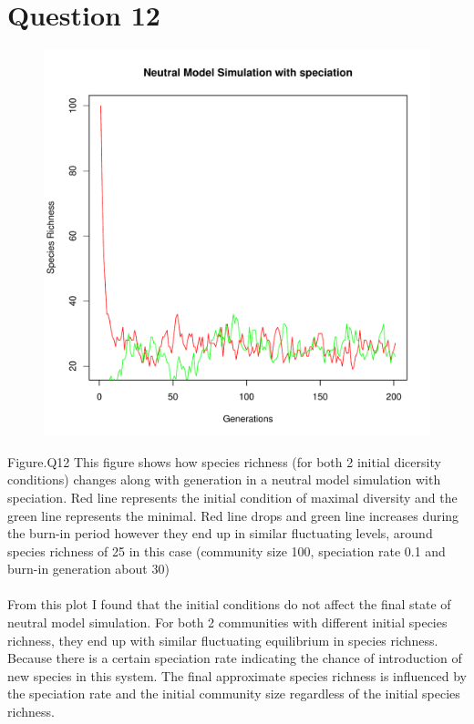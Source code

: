 \documentclass[12pt,a4paper]{article}
\begin{document}
\newpage
\section{Question 12}
\begin{figure}[h]
\centering
\includegraphics[width=\textwidth]{Q12Plot.pdf}
\end{figure}
Figure.Q12 This figure shows how species richness (for both 2 initial dicersity conditions) changes along with generation in a neutral model simulation with speciation.
Red line represents the initial condition of maximal diversity and the green line represents the minimal. Red line drops and green line increases during the burn-in period 
however they end up in similar fluctuating levels, around species richness of 25 in this case (community size 100, speciation rate 0.1 and burn-in generation about 30)
\\
\\
From this plot I found that the initial conditions do not affect the final state of neutral model simulation.
For both 2 communities with different initial species richness, they end up with similar fluctuating equilibrium in species richness.
\\
Because there is a certain speciation rate indicating the chance of introduction of new species in this system.
The final approximate species richness is influenced by the speciation rate and the initial community size regardless of the initial species richness.
\end{document}

